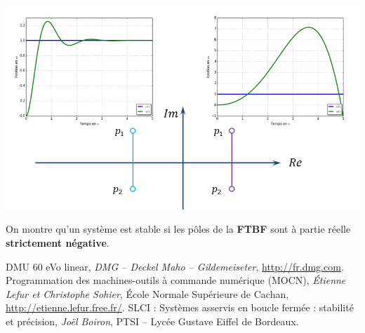 \documentclass[10pt,fleqn]{article} %
\begin{document}
\begin{center}
 \includegraphics[width=.8\textwidth]{images/poles_3}
\end{center}


\begin{resultat}
On montre qu'un système est stable si les pôles de la \textbf{FTBF} sont à partie réelle \textbf{strictement négative}.
\end{resultat}

\begin{thebibliography}{2}
    DMU 60 eVo linear, \textit{DMG -- Deckel Maho -- Gildemeiseter}, \url{http://fr.dmg.com}.
    Programmation des machines-outils à commande numérique (MOCN), \textit{Étienne Lefur et Christophe Sohier}, École Normale Supérieure de Cachan, \url{http://etienne.lefur.free.fr/}.
    SLCI : Systèmes asservis en boucle fermée : stabilité et précision, \textit{Joël Boiron}, PTSI -- Lycée Gustave Eiffel de Bordeaux.

\end{thebibliography}
\end{document}
